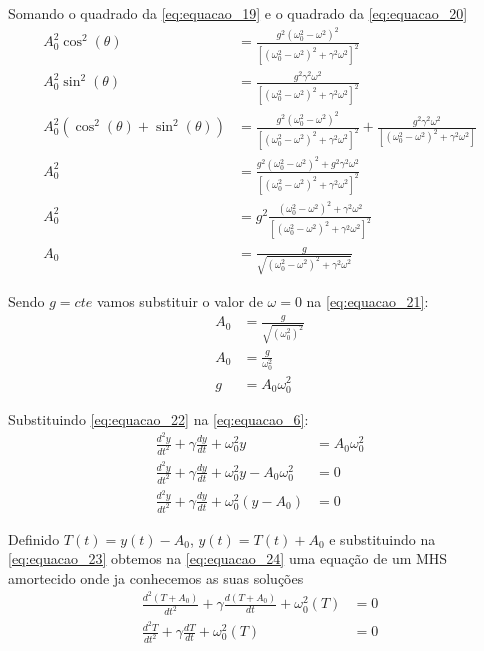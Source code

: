 \documentclass[12pt]{article}
\begin{document}
		Somando o quadrado da \autoref{eq:equacao_19} e o quadrado da \autoref{eq:equacao_20}
		\begin{align}
			A_0^2\cos^2(\theta) &= \frac{g^2(\omega_0^2-\omega^2)^2}{[(\omega_0^2-\omega^2)^2+\gamma^2 \omega^2]^2} \nonumber \\
			A_0^2\sin^2(\theta) &= \frac{g^2\gamma^2 \omega^2}{[(\omega_0^2-\omega^2)^2+\gamma^2 \omega^2]^2} \nonumber \\
			A_0^2(\cos^2(\theta) + \sin^2(\theta)) &= \frac{g^2(\omega_0^2-\omega^2)^2}{[(\omega_0^2-\omega^2)^2+\gamma^2 \omega^2]^2}+\frac{g^2\gamma^2 \omega^2}{[(\omega_0^2-\omega^2)^2+\gamma^2 \omega^2]} \nonumber \\
			A_0^2 &= \frac{g^2(\omega_0^2-\omega^2)^2 + g^2\gamma^2 \omega^2}{[(\omega_0^2-\omega^2)^2+\gamma^2 \omega^2]^2} \nonumber \\
			A_0^2 &= g^2\frac{(\omega_0^2-\omega^2)^2 + \gamma^2 \omega^2}{[(\omega_0^2-\omega^2)^2+\gamma^2 \omega^2]^2} \nonumber \\
			A_0 &= \frac{g}{\sqrt{(\omega_0^2-\omega^2)^2+\gamma^2 \omega^2}} \label{eq:equacao_21}
		\end{align}
		
		Sendo $g=cte$ vamos substituir o valor de $\omega = 0$ na \autoref{eq:equacao_21}:
		\begin{align}
			A_0 &= \frac{g}{\sqrt{(\omega_0^2)^2}} \nonumber \\
			A_0 &= \frac{g}{\omega_0^2} \nonumber \\
			g &= A_0\omega_0^2 \label{eq:equacao_22}
		\end{align}
		
		Substituindo \autoref{eq:equacao_22} na \autoref{eq:equacao_6}:
		\begin{align}
			\frac{d^2y}{dt^2}+\gamma\frac{dy}{dt}+\omega_0^2y &=A_0\omega_0^2 \nonumber \\
			\frac{d^2y}{dt^2}+\gamma\frac{dy}{dt}+\omega_0^2y - A_0\omega_0^2&=0 \nonumber \\
			\frac{d^2y}{dt^2}+\gamma\frac{dy}{dt}+\omega_0^2(y - A_0)&=0 \label{eq:equacao_23}
		\end{align}
		
		Definido $T(t) = y(t) - A_0$, $y(t) = T(t)+A_0$ e substituindo na \autoref{eq:equacao_23} obtemos na \autoref{eq:equacao_24} uma equação de um MHS amortecido onde ja conhecemos as suas soluções
		\begin{align}
			\frac{d^2(T+A_0)}{dt^2}+\gamma\frac{d(T+A_0)}{dt}+\omega_0^2(T)&=0 \nonumber \\
			\frac{d^2T}{dt^2}+\gamma\frac{dT}{dt}+\omega_0^2(T)&=0 \label{eq:equacao_24}
		\end{align}
		
\end{document}
